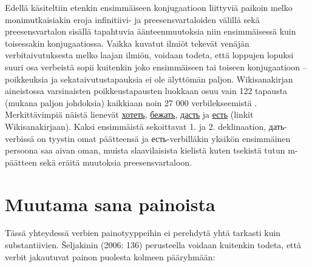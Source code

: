 \documentclass[]{scrreprt}
\begin{document}
Edellä käsiteltiin etenkin ensimmäiseen konjugaatioon liittyviä paikoin
melko monimutkaisiakin eroja infinitiivi- ja preesensvartaloiden välillä
sekä preesensvartalon sisällä tapahtuvia äänteenmuutoksia niin
ensimmäisessä kuin toisessakin konjugaatiossa. Vaikka kuvatut ilmiöt
tekevät venäjän verbitaivutuksesta melko laajan ilmiön, voidaan todeta,
että loppujen lopuksi suuri osa verbeistä sopii kuitenkin joko
ensimmäiseen tai toiseen konjugaatioon -- poikkeuksia ja
sekataivutustapauksia ei ole älyttömän paljon. Wikisanakirjan
aineistossa varsinaisten poikkeustapausten luokkaan osuu vain 122
tapausta (mukana paljon johdoksia) kaikkiaan noin 27 000
verbilekseemistä . Merkittävimpiä näistä lienevät
\href{http://ru.wiktionary.org/wiki/\%D1\%85\%D0\%BE\%D1\%82\%D0\%B5\%D1\%82\%D1\%8C}{хотеть},
\href{http://ru.wiktionary.org/wiki/\%D0\%B1\%D0\%B5\%D0\%B6\%D0\%B0\%D1\%82\%D1\%8C}{бежать},
\href{http://ru.wiktionary.org/wiki/\%D0\%B4\%D0\%B0\%D1\%81\%D1\%82\%D1\%8C}{дасть}
ja
\href{http://ru.wiktionary.org/wiki/\%D0\%B5\%D1\%81\%D1\%82\%D1\%8C}{есть}
(linkit Wikisanakirjaan). Kaksi ensimmäistä sekoittavat 1. ja 2.
deklinaation, дать-verbissä on tyystin omat päätteensä ja
есть-verbilläkin yksikön ensimmäinen persoona saa aivan oman, muista
slaavilaisista kielistä kuten tsekistä tutun m-päätteen sekä eräitä
muutoksia preesensvartaloon.

\section{Muutama sana painoista}\label{muutama-sana-painoista}

Tässä yhteydessä verbien painotyyppeihin ei perehdytä yhtä tarkasti kuin
substantiivien. Šeljakinin (2006: 136) perusteella voidaan kuitenkin
todeta, että verbit jakautuvat painon puolesta kolmeen pääryhmään:
\end{document}
